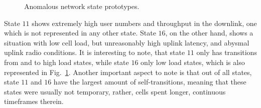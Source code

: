 			\begin{figure}[ht]
				\centering
				\caption[Anomalous network state prototypes]{Anomalous network state prototypes.}
				\label{fig:bars_zoom}
			\end{figure}
			
			State $11$ shows extremely high user numbers and throughput in the downlink, one which is not represented in any other state.
			State $16$, on the other hand, shows a situation with low cell load, but unreasonably high uplink latency, and abysmal uplink radio conditions.
			It is interesting to note, that state $11$ only has transitions from and to high load states, while state $16$ only low load states, which is also represented in Fig.~\ref{fig:bars_zoom}.
			Another important aspect to note is that out of all states, state $11$ and $16$ have the largest amount of self-transitions, meaning that these states were usually not temporary, rather, cells spent longer, continuous timeframes therein.
			
